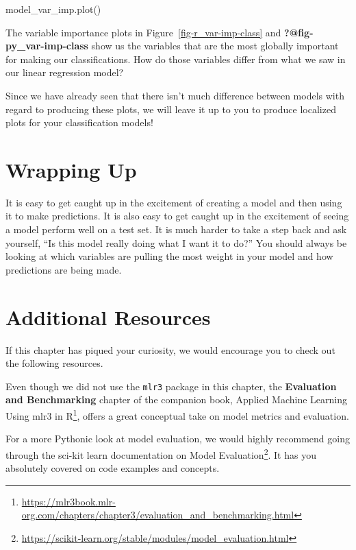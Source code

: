 \documentclass[
  letterpaper,
]{krantz}
\newenvironment{Shaded}{}{}
\newcommand{\NormalTok}[1]{#1}
\DeclareRobustCommand{\href}[2]{#2\footnote{\url{#1}}}
\begin{document}
\begin{Shaded}
\begin{Highlighting}[]
\NormalTok{model\_var\_imp.plot()}
\end{Highlighting}
\end{Shaded}

The variable importance plots in Figure~\ref{fig-r_var-imp-class} and
\textbf{?@fig-py\_var-imp-class} show us the variables that are the most
globally important for making our classifications. How do those
variables differ from what we saw in our linear regression model?

Since we have already seen that there isn't much difference between
models with regard to producing these plots, we will leave it up to you
to produce localized plots for your classification models!

\section{Wrapping Up}\label{wrapping-up}

It is easy to get caught up in the excitement of creating a model and
then using it to make predictions. It is also easy to get caught up in
the excitement of seeing a model perform well on a test set. It is much
harder to take a step back and ask yourself, ``Is this model really
doing what I want it to do?'' You should always be looking at which
variables are pulling the most weight in your model and how predictions
are being made.

\section{Additional Resources}\label{additional-resources}

If this chapter has piqued your curiosity, we would encourage you to
check out the following resources.

Even though we did not use the \texttt{mlr3} package in this chapter,
the \textbf{Evaluation and Benchmarking} chapter of the companion book,
\href{https://mlr3book.mlr-org.com/chapters/chapter3/evaluation_and_benchmarking.html}{Applied
Machine Learning Using mlr3 in R}, offers a great conceptual take on
model metrics and evaluation.

For a more Pythonic look at model evaluation, we would highly recommend
going through the sci-kit learn documentation on
\href{https://scikit-learn.org/stable/modules/model_evaluation.html}{Model
Evaluation}. It has you absolutely covered on code examples and
concepts.
\end{document}
